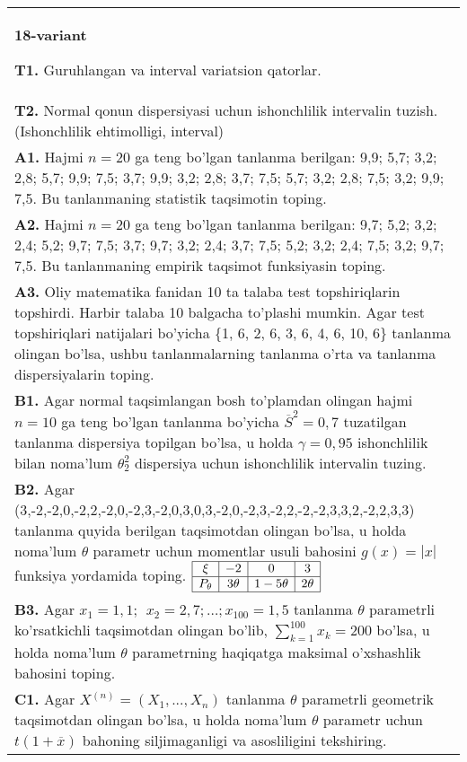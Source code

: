 \documentclass{article}
\begin{document}
\begin{tabular}{m{17cm}}
\textbf{18-variant}
\newline

\textbf{T1.} 
Guruhlangan va interval variatsion qatorlar.
\\
\textbf{T2.} 
Normal qonun dispersiyasi uchun ishonchlilik intervalin tuzish. (Ishonchlilik ehtimolligi, interval)
\\
\textbf{A1.} 
Hajmi \(n = 20\) ga teng bo'lgan tanlanma berilgan: 9,9; 5,7; 3,2; 2,8; 5,7; 9,9; 7,5; 3,7; 9,9; 3,2; 2,8; 3,7; 7,5; 5,7; 3,2; 2,8; 7,5; 3,2; 9,9; 7,5. Bu tanlanmaning statistik taqsimotin toping.
\\
\textbf{A2.} 
Hajmi \(n = 20\) ga teng bo'lgan tanlanma berilgan: 9,7; 5,2; 3,2; 2,4; 5,2; 9,7; 7,5; 3,7; 9,7; 3,2; 2,4; 3,7; 7,5; 5,2; 3,2; 2,4; 7,5; 3,2; 9,7; 7,5. Bu tanlanmaning empirik taqsimot funksiyasin toping.
\\
\textbf{A3.} 
Oliy matematika fanidan 10 ta talaba test topshiriqlarin topshirdi. Harbir talaba 10 balgacha to'plashi mumkin. Agar test topshiriqlari natijalari bo'yicha \{1, 6, 2, 6, 3, 6, 4, 6, 10, 6\} tanlanma olingan bo'lsa, ushbu tanlanmalarning tanlanma o'rta va tanlanma dispersiyalarin toping.
\\
\textbf{B1.} 
Agar normal taqsimlangan bosh to'plamdan olingan hajmi \(n = 10\) ga teng bo'lgan tanlanma bo'yicha \({\overline{S}}^{2} = 0,7\) tuzatilgan tanlanma dispersiya topilgan bo'lsa, u holda \(\gamma = 0,95\) ishonchlilik bilan noma'lum \(\theta_{2}^{2}\) dispersiya uchun ishonchlilik intervalin tuzing.
\\
\textbf{B2.} 
Agar (3,-2,-2,0,-2,2,-2,0,-2,3,-2,0,3,0,3,-2,0,-2,3,-2,2,-2,-2,3,3,2,-2,2,3,3) tanlanma quyida berilgan taqsimotdan olingan bo'lsa, u holda noma'lum \(\theta\) parametr uchun momentlar usuli bahosini \(g(x) = |x|\) funksiya yordamida toping.
$\begin{array}{|c|c|c|c|}
    \hline
    \xi & -2 & 0 & 3 \\
    \hline
    P_{\theta} & 3\theta & 1 - 5\theta & 2\theta \\
    \hline
\end{array}$
\\
\textbf{B3.} 
Agar \(x_{1} = 1,1;\ \ x_{2} = 2,7;\ldots;x_{100} = 1,5\) tanlanma \(\theta\) parametrli ko'rsatkichli taqsimotdan olingan bo'lib, \(\sum_{k = 1}^{100}x_{k} = 200\) bo'lsa, u holda noma'lum \(\theta\) parametrning haqiqatga maksimal o'xshashlik bahosini toping.
\\
\textbf{C1.} 
Agar \(X^{(n)} = \left( X_{1},...,X_{n} \right)\) tanlanma \(\theta\) parametrli geometrik taqsimotdan olingan bo'lsa, u holda noma'lum \(\theta\) parametr uchun \(t(1 + \overline{x})\) bahoning siljimaganligi va asosliligini tekshiring.

\end{tabular}
\end{document}
